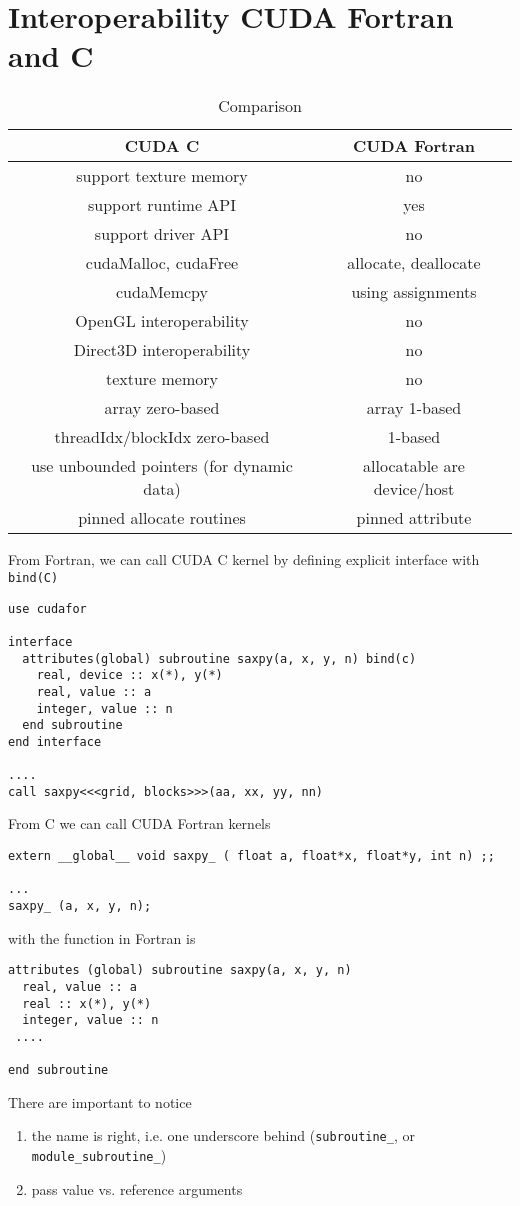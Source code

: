 
\chapter{Interoperability CUDA Fortran and C}
\label{chap:inter-cuda-fortr}

\begin{table}[hbt]
\begin{center}
\caption{Comparison}
\begin{tabular}{cc} 
  \hline
  CUDA C & CUDA Fortran \\ 
  \hline\hline
  support texture memory & no \\
  support runtime API & yes \\
  support driver API & no \\
  cudaMalloc, cudaFree & allocate, deallocate \\
  cudaMemcpy & using assignments \\
  OpenGL interoperability & no\\
  Direct3D interoperability & no \\
  texture memory & no \\
  array zero-based & array 1-based \\
  threadIdx/blockIdx zero-based & 1-based \\
  use unbounded pointers (for dynamic data) & allocatable are device/host \\
  pinned allocate routines & pinned attribute \\
\hline
\end{tabular}
\end{center}
\label{tab:CUDA_F_C}
\end{table}

From Fortran, we can call CUDA C kernel by defining explicit interface
with \verb!bind(C)!
\begin{lstlisting}
use cudafor

interface
  attributes(global) subroutine saxpy(a, x, y, n) bind(c)
    real, device :: x(*), y(*)
    real, value :: a
    integer, value :: n
  end subroutine
end interface

....
call saxpy<<<grid, blocks>>>(aa, xx, yy, nn)
\end{lstlisting}

From C we can call CUDA Fortran kernels
\begin{lstlisting}
extern __global__ void saxpy_ ( float a, float*x, float*y, int n) ;;

...
saxpy_ (a, x, y, n);
\end{lstlisting}
with the function in Fortran is
\begin{lstlisting}
attributes (global) subroutine saxpy(a, x, y, n)
  real, value :: a
  real :: x(*), y(*)
  integer, value :: n
 ....

end subroutine
\end{lstlisting}
There are important to notice
\begin{enumerate}
\item the name is right, i.e. one underscore behind
  (\verb!subroutine_!, or \verb!module_subroutine_!)
\item pass value vs. reference arguments
\end{enumerate}


